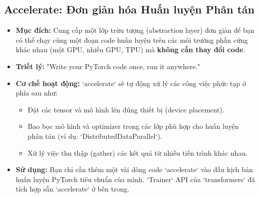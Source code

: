 \subsection{Accelerate: Đơn giản hóa Huấn luyện Phân tán}
\label{ssec:hf_accelerate}
\begin{itemize}
    \item \textbf{Mục đích:} Cung cấp một lớp trừu tượng (abstraction layer) đơn giản để bạn có thể chạy cùng một đoạn code huấn luyện trên các môi trường phần cứng khác nhau (một GPU, nhiều GPU, TPU) mà \textbf{không cần thay đổi code}.
    \item \textbf{Triết lý:} "Write your PyTorch code once, run it anywhere."
    \item \textbf{Cơ chế hoạt động:} `accelerate` sẽ tự động xử lý các công việc phức tạp ở phía sau như:
        \begin{itemize}
            \item Đặt các tensor và mô hình lên đúng thiết bị (device placement).
            \item Bao bọc mô hình và optimizer trong các lớp phù hợp cho huấn luyện phân tán (ví dụ: `DistributedDataParallel`).
            \item Xử lý việc thu thập (gather) các kết quả từ nhiều tiến trình khác nhau.
        \end{itemize}
    \item \textbf{Sử dụng:} Bạn chỉ cần thêm một vài dòng code `accelerate` vào đầu kịch bản huấn luyện PyTorch tiêu chuẩn của mình. `Trainer` API của `transformers` đã tích hợp sẵn `accelerate` ở bên trong.
\end{itemize}

